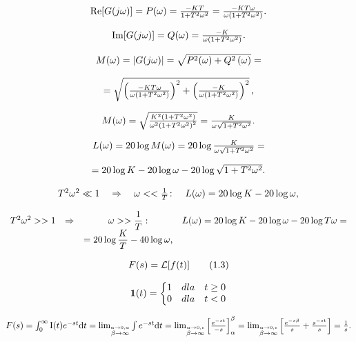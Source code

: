 \documentclass{article}
\begin{document}
\[
$$
\mathrm{R e} [ G ( j \omega) ]=P ( \omega)=\frac{-K T} {1+T^{2} \omega^{2}}=\frac{-K T \omega} {\omega( 1+T^{2} \omega^{2} )}.
$$
\]

\[
$$
\mathrm{I m} [ G ( j \omega) ]=Q ( \omega)=\frac{-K} {\omega( 1+T^{2} \omega^{2} )}.
$$
\]

\[
$$
M ( \omega)=\left| G ( j \omega) \right|=\sqrt{P^{2} ( \omega)+Q^{2} \left( \omega\right)}=
$$
\]

\[
$$
= \sqrt{\left( {\frac{-K T \omega} {\omega( 1+T^{2} \omega^{2} )}} \right)^{2}+\left( {\frac{-K} {\omega( 1+T^{2} \omega^{2} )}} \right)^{2}} \,,
$$
\]

\[
$$
M ( \omega)=\sqrt{\frac{K^{2} ( 1+T^{2} \omega^{2} )} {\omega^{2} {( 1+T^{2} \omega^{2} )}^{2}}}=\frac{K} {\omega\sqrt{1+T^{2} \omega^{2}}}.
$$
\]

\[
$$
L ( \omega)=2 0 \log M ( \omega)=2 0 \log\frac{K} {\omega\sqrt{1+T^{2} \omega^{2}}}=
$$
\]

\[
$$
= 2 0 \log K-2 0 \log\omega-2 0 \log\sqrt{1+T^{2} \omega^{2}}.
$$
\]

\[
$$
T^{2} \omega^{2} \ll1 \quad\Rightarrow\quad\omega< < \frac{1} {T} \colon\quad L ( \omega)=2 0 \log K-2 0 \log\omega,
$$
\]

\[
$$
\begin{array} {c c c c} {T^{2} \omega^{2} > > 1} & {\Rightarrow} & {\omega> > \displaystyle\frac{1} {T} :} & {L ( \omega)=2 0 \log K-2 0 \log\omega-2 0 \log T \omega=} \\ {} & {} & {=2 0 \log\displaystyle\frac{K} {T}-4 0 \log\omega,} \\ \end{array}
$$
\]

\[
$$
F ( s )={\mathcal{L}} [ f ( t ) ] \tag{1.3}
$$
\]

\[
$$
{\bf1} ( t )=\left\{\begin{matrix} 1 & {d l a} & {t \geq0} \\ {0} & {d l a} & {t < 0} \\ \end{matrix} \right.
$$
\]

\[
$$
F ( s )=\int_{0}^{\infty} \mathrm{I} ( t ) e^{-s t} \mathrm{d} t=\lim_{\stackrel{\alpha\rightarrow0, \alpha} {\beta\rightarrow\infty}} \int e^{-s t} \mathrm{d} t=\lim_{\stackrel{\alpha\rightarrow0, \epsilon} {\beta\rightarrow\infty}} \left[ \frac{e^{-s t}} {-s} \right]_{\alpha}^{\beta}=\lim_{\stackrel{\alpha\rightarrow0, \epsilon} {\beta\rightarrow\infty}} \left[ \frac{e^{-s \beta}} {s}+\frac{s^{-s t}} {s} \right]=\frac{1} {s}.
$$
\]
\end{document}
